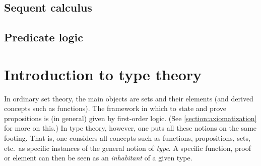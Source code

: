 \subsection{Sequent calculus}\label{section:sequent_calculus}



\subsection{Predicate logic}


\section{Introduction to type theory}

    In ordinary set theory, the main objects are sets and their elements (and derived concepts such as functions). The framework in which to state and prove propositions is (in general) given by first-order logic. (See \cref{section:axiomatization} for more on this.) In type theory, however, one puts all these notions on the same footing. That is, one considers all concepts such as functions, propositions, sets, etc.~as specific instances of the general notion of \textit{type}. A specific function, proof or element can then be seen as an \textit{inhabitant} of a given type.

